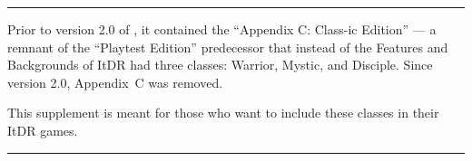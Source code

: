 \documentclass[itdr/core]{subfiles}
\begin{document}
\toc[4] %

\vfill

\noindent\hspace*{0.5\linewidth}
\begin{minipage}{\linewidth}
\hrule
\skipline[1.5ex]
Prior to version 2.0 of \game, it contained the ``Appendix C: Class-ic Edition'' --- a remnant of the ``Playtest Edition'' predecessor that instead of the Features and Backgrounds of ItDR had three classes: Warrior, Mystic, and Disciple. Since version 2.0, Appendix~C was removed.\tight

\setlength\parindent{10pt}

This supplement is meant for those who want to include these classes in their ItDR games.
\skipline[0.5ex]
\hrule
\end{minipage}

\vfill
\end{document}
